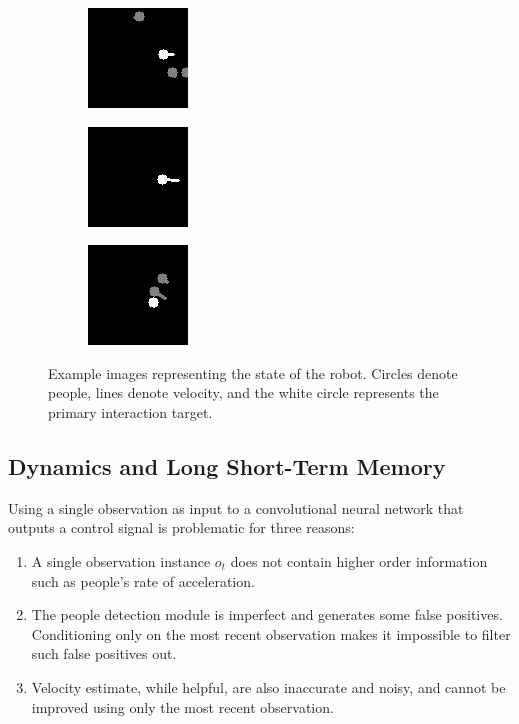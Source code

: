 \documentclass[letterpaper, 10 pt, conference]{ieeeconf}
\begin{document}
  	\begin{figure}[tbh]
  	\centering
      \begin{subfigure}[b]{0.30\columnwidth}
    \includegraphics[scale = 0.80]{images/state1.png}
    \label{fig:state1}
  \end{subfigure}
  \begin{subfigure}[b]{0.30\columnwidth}
    \includegraphics[scale = 0.80]{images/state2.png}
       \label{fig:state2}
  \end{subfigure} 
    \begin{subfigure}[b]{0.30\columnwidth}
    \includegraphics[scale = 0.80]{images/state3.png}
       \label{fig:state3}
  \end{subfigure}
  \caption{Example images representing the state of the robot. Circles denote people, lines denote velocity, and the white circle represents the primary interaction target.}

    \vspace{-2mm}
  \label{fig:state}
  \end{figure}

\subsection{Dynamics and Long Short-Term Memory}
Using a single observation as input to a convolutional neural network that outputs a control signal is problematic for three reasons:

\begin{enumerate}
\item A single observation instance $o_t$ does not contain higher order information such as people's rate of  acceleration.
\item The people detection module is imperfect and generates some false positives.  Conditioning only on the most recent observation makes it impossible to filter such false positives out.
\item Velocity estimate, while helpful, are also inaccurate and noisy, and cannot be improved using only the most recent observation.
\end{enumerate}
\end{document}
